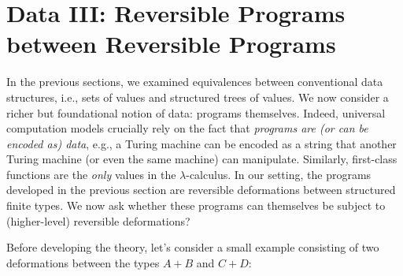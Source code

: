 \documentclass{article}
\begin{document}
\section{Data III: Reversible Programs between Reversible Programs}
\label{sec:pi2}

In the previous sections, we examined equivalences between
conventional data structures, i.e., sets of values and structured trees
of values. We now consider a richer but
foundational notion of data: programs themselves. Indeed, universal
computation models crucially rely on the fact that \emph{programs
are (or can be encoded as) data}, e.g., a Turing machine can be
encoded as a string that another Turing machine (or even the same
machine) can manipulate. Similarly, first-class functions are
the \emph{only} values in the $\lambda$-calculus.
In our setting, the programs developed in the
previous section are reversible deformations between structured finite
types. We now ask whether these programs can themselves
be subject to (higher-level) reversible deformations?

Before developing the theory, let's consider a small example
consisting of two deformations between the types $A + B$ and $C+D$:
\end{document}
